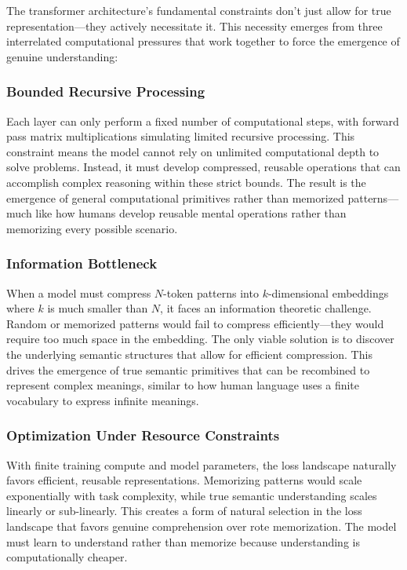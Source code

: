 \documentclass[12pt]{article}
\begin{document}
The transformer architecture's fundamental constraints don't just allow for true representation---they actively necessitate it. This necessity emerges from three interrelated computational pressures that work together to force the emergence of genuine understanding:

\subsubsection{Bounded Recursive Processing}
Each layer can only perform a fixed number of computational steps, with forward pass matrix multiplications simulating limited recursive processing. This constraint means the model cannot rely on unlimited computational depth to solve problems. Instead, it must develop compressed, reusable operations that can accomplish complex reasoning within these strict bounds. The result is the emergence of general computational primitives rather than memorized patterns---much like how humans develop reusable mental operations rather than memorizing every possible scenario.

\subsubsection{Information Bottleneck}
When a model must compress $N$-token patterns into $k$-dimensional embeddings where $k$ is much smaller than $N$, it faces an information theoretic challenge. Random or memorized patterns would fail to compress efficiently---they would require too much space in the embedding. The only viable solution is to discover the underlying semantic structures that allow for efficient compression. This drives the emergence of true semantic primitives that can be recombined to represent complex meanings, similar to how human language uses a finite vocabulary to express infinite meanings.

\subsubsection{Optimization Under Resource Constraints}
With finite training compute and model parameters, the loss landscape naturally favors efficient, reusable representations. Memorizing patterns would scale exponentially with task complexity, while true semantic understanding scales linearly or sub-linearly. This creates a form of natural selection in the loss landscape that favors genuine comprehension over rote memorization. The model must learn to understand rather than memorize because understanding is computationally cheaper.
\end{document}
